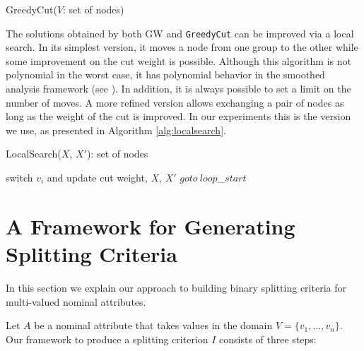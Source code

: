 \begin{algorithm}[tb]
   \caption{ GreedyCut($V$: set of nodes)}
   \label{alg:greedy}
\begin{algorithmic}
\ENDFOR
{}

\end{algorithmic}
\end{algorithm}


The solutions obtained by both GW and {\tt GreedyCut} 
can be improved via a local search.
In its simplest version, it
moves a node from one group to
the other while some improvement on the cut weight is possible.
Although this algorithm is not polynomial  in the worst case,
it has polynomial behavior in the smoothed analysis framework (see \cite{journals/corr/AngelBPW16}). In addition, it is always possible
to set a limit on the number of moves.
A more refined version  allows exchanging a pair of nodes
as long as the weight of the cut is improved.
In our experiments this is the version we use, as presented in Algorithm \ref{alg:localsearch}.


\begin{algorithm}[tb]
   \caption{ LocalSearch($X$, $X'$): set of nodes}
   \label{alg:localsearch}
\begin{algorithmic}
\STATE switch $v_i$ and update cut weight, $X$, $X'$
\STATE $goto~ loop$\_$start$
\ENDIF
\ENDFOR
{}
\ENDIF
\ENDFOR
{}

\end{algorithmic}
\end{algorithm}


\section{A Framework for Generating Splitting Criteria}
\label{sec:maxcut}
In this section we explain 
our approach to building binary splitting criteria
for  multi-valued nominal attributes.

Let $A$ be a nominal attribute  that takes
values in the domain $V=\{v_1,\ldots,v_n\}$.
Our framework to produce a splitting criterion $I$ 
consists of three steps:

